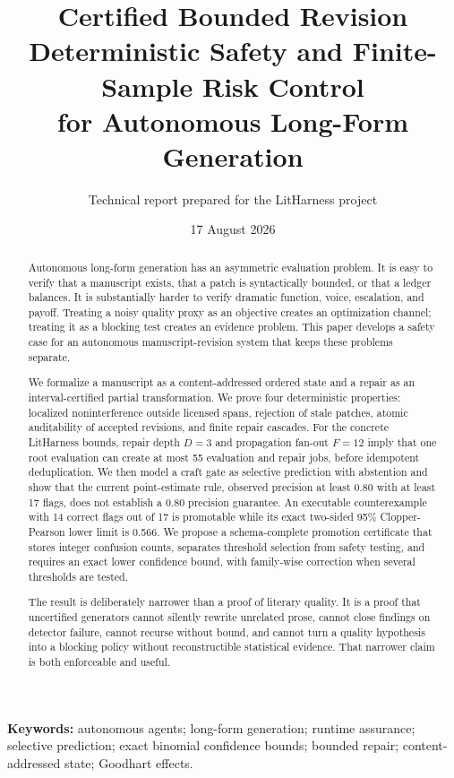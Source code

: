 \documentclass[11pt]{article}
\title{\textbf{Certified Bounded Revision}\\[0.35em]
\large Deterministic Safety and Finite-Sample Risk Control\\
for Autonomous Long-Form Generation}
\author{Technical report prepared for the LitHarness project}
\date{17 August 2026}
\begin{document}
\maketitle

\begin{abstract}
Autonomous long-form generation has an asymmetric evaluation problem. It is easy to
verify that a manuscript exists, that a patch is syntactically bounded, or that a ledger
balances. It is substantially harder to verify dramatic function, voice, escalation, and
payoff. Treating a noisy quality proxy as an objective creates an optimization channel;
treating it as a blocking test creates an evidence problem. This paper develops a safety
case for an autonomous manuscript-revision system that keeps these problems separate.

We formalize a manuscript as a content-addressed ordered state and a repair as an
interval-certified partial transformation. We prove four deterministic properties:
localized noninterference outside licensed spans, rejection of stale patches, atomic
auditability of accepted revisions, and finite repair cascades. For the concrete
LitHarness bounds, repair depth $D=3$ and propagation fan-out $F=12$ imply that one root
evaluation can create at most 55 evaluation and repair jobs, before idempotent
deduplication. We then model a craft gate as selective prediction with abstention and show
that the current point-estimate rule, observed precision at least 0.80 with at least 17
flags, does not establish a 0.80 precision guarantee. An executable counterexample with
14 correct flags out of 17 is promotable while its exact two-sided 95\% Clopper-Pearson
lower limit is 0.566. We propose a schema-complete promotion certificate that stores
integer confusion counts, separates threshold selection from safety testing, and requires
an exact lower confidence bound, with family-wise correction when several thresholds are
tested.

The result is deliberately narrower than a proof of literary quality. It is a proof that
uncertified generators cannot silently rewrite unrelated prose, cannot close findings on
detector failure, cannot recurse without bound, and cannot turn a quality hypothesis into
a blocking policy without reconstructible statistical evidence. That narrower claim is
both enforceable and useful.
\end{abstract}

\noindent\textbf{Keywords:} autonomous agents; long-form generation; runtime assurance;
selective prediction; exact binomial confidence bounds; bounded repair; content-addressed
state; Goodhart effects.
\end{document}
